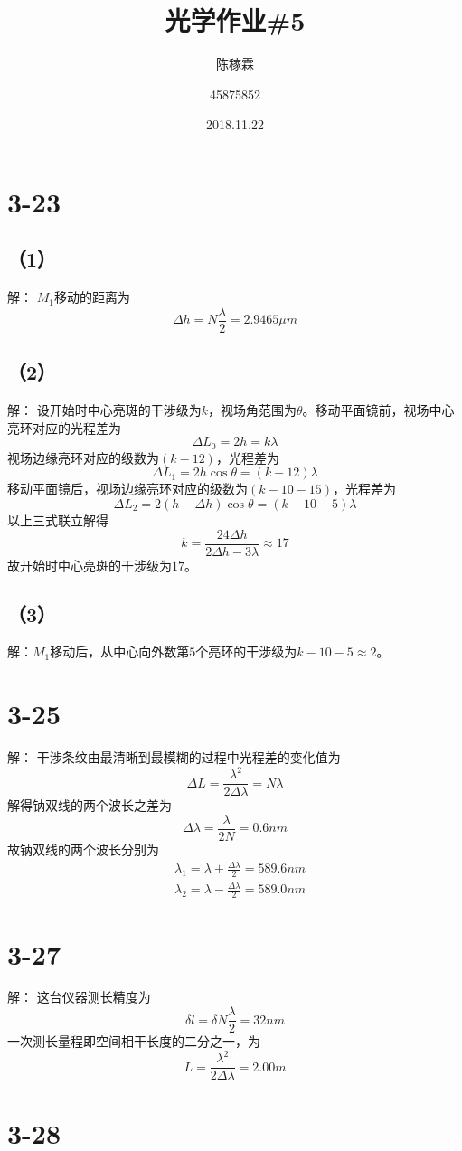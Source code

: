 \documentclass[10pt,a4paper]{article}
\title{光学作业\#5}
\author{陈稼霖 \and 45875852}
\date{2018.11.22}
\begin{document}
\maketitle
\section*{3-23}
\subsection*{（1）}解：
$M_1$移动的距离为
\[
\Delta h = N\frac{\lambda}{2} = 2.9465\mu m
\]
\subsection*{（2）}解：
设开始时中心亮斑的干涉级为$k$，视场角范围为$\theta$。移动平面镜前，视场中心亮环对应的光程差为
\[
\Delta L_0 = 2h = k\lambda
\]
视场边缘亮环对应的级数为$(k-12)$，光程差为
\[
\Delta L_1 = 2h\cos\theta = (k-12)\lambda
\]
移动平面镜后，视场边缘亮环对应的级数为$(k-10-15)$，光程差为
\[
\Delta L_2 = 2(h-\Delta h)\cos\theta = (k-10-5)\lambda
\]
以上三式联立解得
\[
k = \frac{24\Delta h}{2\Delta h-3\lambda} \approx 17
\]
故开始时中心亮斑的干涉级为$17$。
\subsection*{（3）}解：$M_1$移动后，从中心向外数第$5$个亮环的干涉级为$k-10-5 \approx 2$。
\section*{3-25}解：
干涉条纹由最清晰到最模糊的过程中光程差的变化值为
\[
\Delta L= \frac{\lambda^2}{2\Delta\lambda} = N\lambda
\]
解得钠双线的两个波长之差为
\[
\Delta\lambda = \frac{\lambda}{2N} = 0.6nm
\]
故钠双线的两个波长分别为
\begin{align*}
&\lambda_1 = \lambda+\frac{\Delta \lambda}{2} = 589.6nm\\
&\lambda_2 = \lambda-\frac{\Delta \lambda}{2} = 589.0nm
\end{align*}
\section*{3-27}解：
这台仪器测长精度为
\[
\delta l = \delta N\frac{\lambda}{2} = 32nm
\]
一次测长量程即空间相干长度的二分之一，为
\[
L = \frac{\lambda^2}{2\Delta\lambda} = 2.00m
\]
\section*{3-28}
\end{document}
